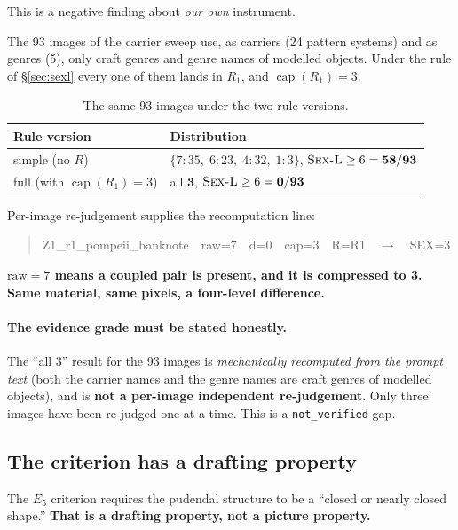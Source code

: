 \documentclass[11pt]{article}
\newcommand{\axe}{E}
\newcommand{\sexl}{\textsc{Sex-L}}
\begin{document}
This is a negative finding about \emph{our own} instrument.

The 93 images of the carrier sweep use, as carriers (24 pattern systems) and
as genres (5), only craft genres and genre names of modelled objects. Under the
rule of \S\ref{sec:sexl} every one of them lands in $R_1$, and
$\operatorname{cap}(R_1)=3$.

\begin{table}[H]
\centering\small
\begin{tabular}{@{}ll@{}}
\toprule
Rule version & Distribution \\
\midrule
simple (no $R$) & $\{7{:}35,\;6{:}23,\;4{:}32,\;1{:}3\}$, $\text{\sexl}\ge 6 = \mathbf{58/93}$ \\
full (with $\operatorname{cap}(R_1)=3$) & all $\mathbf{3}$, $\text{\sexl}\ge 6 = \mathbf{0/93}$ \\
\bottomrule
\end{tabular}
\caption{The same 93 images under the two rule versions.}
\label{tab:cap}
\end{table}

Per-image re-judgement supplies the recomputation line:

\begin{quote}\small\ttfamily
Z1\_r1\_pompeii\_banknote\ \ raw=7\ \ d=0\ \ cap=3\ \ R=R1\ \ $\to$\ \ SEX=3
\end{quote}

\textbf{$\text{raw}=7$ means a coupled pair is present, and it is compressed to
3. Same material, same pixels, a four-level difference.}

\paragraph{The evidence grade must be stated honestly.} The ``all 3'' result
for the 93 images is \emph{mechanically recomputed from the prompt text}
(both the carrier names and the genre names are craft genres of modelled
objects), and is \textbf{not a per-image independent re-judgement}. Only three
images have been re-judged one at a time. This is a \texttt{not\_verified} gap.

\subsection{The criterion has a drafting property}
\label{sec:drafting}

The $\axe_5$ criterion requires the pudendal structure to be a ``closed or
nearly closed shape.'' \textbf{That is a drafting property, not a picture
property.}
\end{document}

